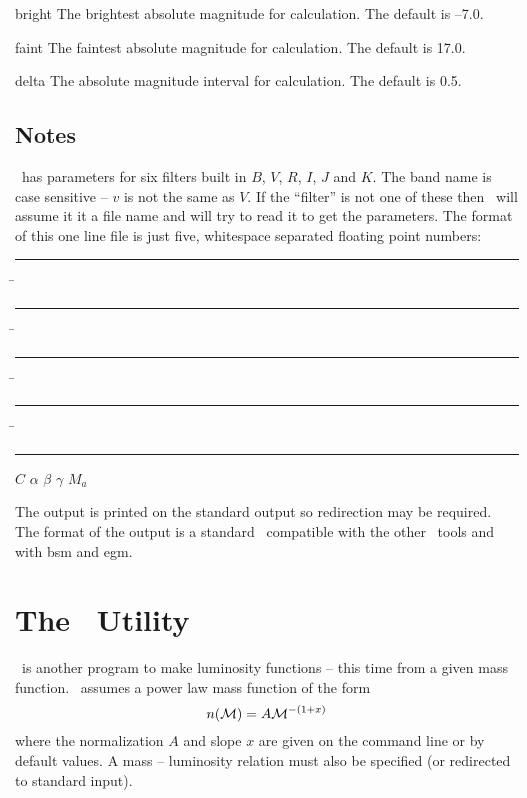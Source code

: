 \documentclass[11pt,twoside]{article}
\begin{document}
\begin{clo}{bright}
The brightest absolute magnitude for calculation. The default is --7.0.
\end{clo}

\begin{clo}{faint}
The faintest absolute magnitude for calculation. The default is 17.0.
\end{clo}

\begin{clo}{delta}
The absolute magnitude interval for calculation. The default is 0.5.
\end{clo}

\subsection*{Notes}

\mkfms\ has parameters for six filters built in $B$, $V$, $R$, $I$, $J$
and $K$. The band name is case sensitive -- $v$ is not the same as $V$. If the
``filter'' is not one of these then \mkfms\ will assume it it a file name and 
will try to read it to get the parameters. The format of this one line file is
just five, whitespace separated floating point numbers:

\begin{tabbing}
\rule{1cm}{0cm} \= \rule{1cm}{0cm} \= \rule{1cm}{0cm} \= \rule{1cm}{0cm} \= \rule{1cm}{0cm} \kill
$C$ \> $\alpha$ \> $\beta$ \> $\gamma$ \> $M_a$ 
\end{tabbing}

The output is printed on the standard output so redirection may be required.
The format of the output is a standard \lf\ compatible with the other \gmu\
tools and with {\sc bsm} and {\sc egm}.


\newpage
\section{The \mkmlf\ Utility}

\mkmlf\ is another program to make luminosity functions -- this time from
a given mass function. \mkmlf\ assumes a power law mass function of the form
\[
n({\cal M}) = A {\cal M}^{-(1+x)}
\]
where the normalization $A$ and slope $x$ are given on the command line or
by default values. A mass -- luminosity relation must also be specified (or
redirected to standard input).
\end{document}
